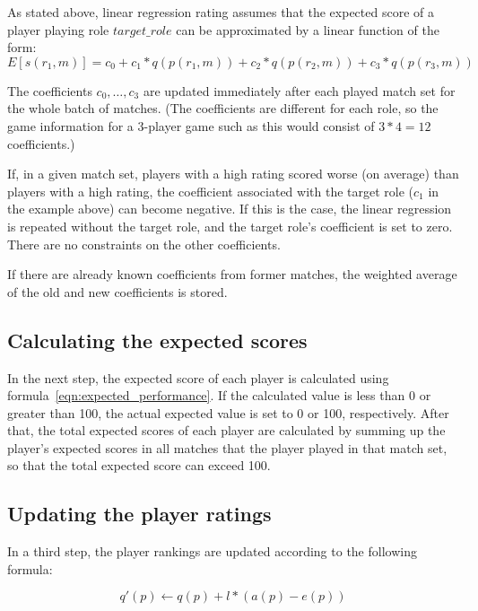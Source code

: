 \documentclass[a4paper,10pt]{article}
\begin{document}
As stated above, linear regression rating assumes that the expected score of a player playing role $target\_role$ can be approximated by a linear function of the form:
\begin{equation}
	E[s(r_1, m)] = c_0 + c_1*q(p(r_1, m)) + c_2*q(p(r_2, m)) + c_3*q(p(r_3, m)) 
	\label{eqn:expected_performance}
\end{equation} 

The coefficients $c_0, \dotsc, c_3$ are updated immediately after each played match set for the whole batch of matches. (The coefficients are different for each role, so the game information for a 3-player game such as this would consist of $3 * 4 = 12$ coefficients.)

If, in a given match set, players with a high rating scored worse (on average) than players with a high rating, the coefficient associated with the target role ($c_1$ in the example above) can become negative. If this is the case, the linear regression is repeated without the target role, and the target role's coefficient is set to zero. There are no constraints on the other coefficients.

If there are already known coefficients from former matches, the weighted average of the old and new coefficients is stored.

\subsection{Calculating the expected scores}
\label{sec:calculating_expected_scores}
In the next step, the expected score of each player is calculated using formula~\ref{eqn:expected_performance}. If the calculated value is less than 0 or greater than 100, the actual expected value is set to 0 or 100, respectively. After that, the total expected scores of each player are calculated by summing up the player's expected scores in all matches that the player played in that match set, so that the total expected score can exceed 100.


\subsection{Updating the player ratings}
\label{sec:updating_player_ratings}

In a third step, the player rankings are updated according to the following formula:

\begin{equation}
 q'(p) \leftarrow q(p) + l * (a(p) - e(p))
\end{equation} 
\end{document}
